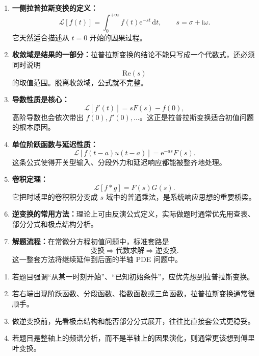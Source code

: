 \begin{zhongyao}[本章主要结论]
\raggedright
\begin{enumerate}
    \item \textbf{一侧拉普拉斯变换的定义：}
    \[
        \mathcal{L}[f(t)]
        =
        \int_0^{+\infty} f(t)\mathrm{e}^{-st}\,\mathrm{d}t,
        \qquad
        s=\sigma+\mathrm{i}\omega.
    \]
    它天然适合描述从 $t=0$ 开始的因果过程。

    \item \textbf{收敛域是结果的一部分：}拉普拉斯变换的结论不能只写成一个代数式，还必须同时说明
    \[
        \mathrm{Re}(s)
    \]
    的取值范围。脱离收敛域，公式就不完整。

    \item \textbf{导数性质是核心：}
    \[
        \mathcal{L}[f'(t)]
        =
        sF(s)-f(0),
    \]
    高阶导数也会依次带出 $f(0),f'(0),\dots$。这正是拉普拉斯变换适合初值问题的根本原因。

    \item \textbf{单位阶跃函数与延迟性质：}
    \[
        \mathcal{L}[f(t-a)u(t-a)]
        =
        \mathrm{e}^{-as}F(s).
    \]
    这条公式使得开关型输入、分段外力和延迟响应都能被整齐地处理。

    \item \textbf{卷积定理：}
    \[
        \mathcal{L}[f*g]=F(s)G(s).
    \]
    它把时域里的卷积积分变成 $s$ 域中的普通乘法，是系统响应思想的重要桥梁。

    \item \textbf{逆变换的常用方法：}理论上可由反演公式定义，实际做题时通常优先用查表、部分分式和极点结构分析。

    \item \textbf{解题流程：}在常微分方程初值问题中，标准套路是
    \[
        \text{变换}
        \Longrightarrow
        \text{代数求解}
        \Longrightarrow
        \text{逆变换}.
    \]
    这一整套方法将继续延伸到后面的半轴 PDE 问题中。
\end{enumerate}
\end{zhongyao}

\begin{tishi}[做题时的判断思路]
\begin{enumerate}
    \item 若题目强调``从某一时刻开始''、``已知初始条件''，应优先想到拉普拉斯变换。
    \item 若右端出现阶跃函数、分段函数、指数函数或三角函数，拉普拉斯变换通常很顺手。
    \item 做逆变换前，先看极点结构和能否部分分式展开，往往比直接套公式更稳妥。
    \item 若题目是整轴上的频谱分析，而不是半轴上的因果演化，则通常更该想到傅里叶变换。
\end{enumerate}
\end{tishi}

